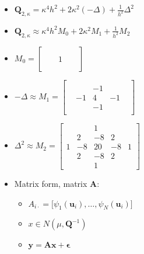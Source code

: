 \documentclass{article}
\begin{document}
\begin{itemize}
\item $\pmb{Q}_{2, \kappa} = \kappa^{4} h^{2} + 2 \kappa^{2}(-\Delta) + \frac{1}{h^{2}} \Delta^{2}$
\item $\pmb{Q}_{2, \kappa} \approx \kappa^{4} h^{2} M_{0} + 2 \kappa^{2} M_{1} + \frac{1}{h^{2}} M_{2}$

\item $M_{0} = 
        \begin{bmatrix}
        &    &   &    &     \\ 
        &   &  &   &     \\ 
        &  & 1 &  &    \\ 
        &   &  &   &     \\ 
        &   &   &    & 
        \end{bmatrix}
     $
\item     $-\Delta \approx M_{1} = 
        \begin{bmatrix}
        &    &  &    &     \\ 
        &   & -1 &   &     \\ 
       & -1 & 4 & -1 &    \\ 
        &   & -1 &   &     \\ 
        &    &   &    & 
     \end{bmatrix} $
      
     
\item $ \Delta^{2} \approx M_{2} = 
        \begin{bmatrix}
        &    & 1  &    &     \\ 
        & 2  & -8 & 2  &     \\ 
      1 & -8 & 20 & -8 & 1   \\ 
        & 2  & -8 & 2  &     \\ 
        &    & 1  &    & 
     \end{bmatrix} $

\item Matrix form, matrix $\pmb{A}$:
  \begin{itemize}
  \item $ A_{i \cdot} = \big[ \psi_{1} (\pmb{u}_{i}), \dots, \psi_{N}(\pmb{u}_{i}) \big] $
  \item $x \in N(\mu, \pmb{Q}^{-1})$
  \item $\pmb{y} = \pmb{Ax} + \pmb{\epsilon}$
  \end{itemize}

\end{itemize}  
\end{document}
